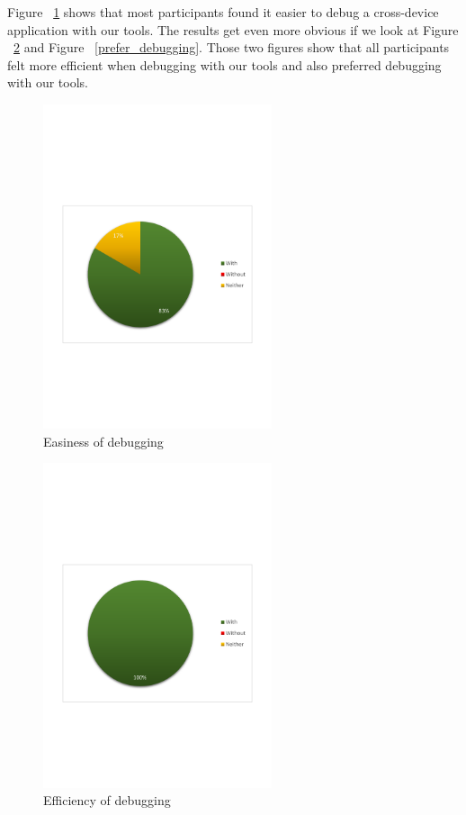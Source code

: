 Figure ~\ref{fig:debugging_easier} shows that most participants found it easier to debug a cross-device application with our tools. The results get even more obvious if we look at Figure ~\ref{fig:debugging_efficient} and Figure ~\ref{prefer_debugging}. Those two figures show that all participants felt more efficient when debugging with our tools and also preferred debugging with our tools.

\begin{figure}[H]
  \centering
    \includegraphics[width=0.6\textwidth]{images/charts/debugging_easier.pdf}
	\caption{Easiness of debugging}
	\label{fig:debugging_easier}
\end{figure}

\begin{figure}[H]
  \centering
    \includegraphics[width=0.6\textwidth]{images/charts/debugging_efficient.pdf}
	\caption{Efficiency of debugging}
	\label{fig:debugging_efficient}
\end{figure}

